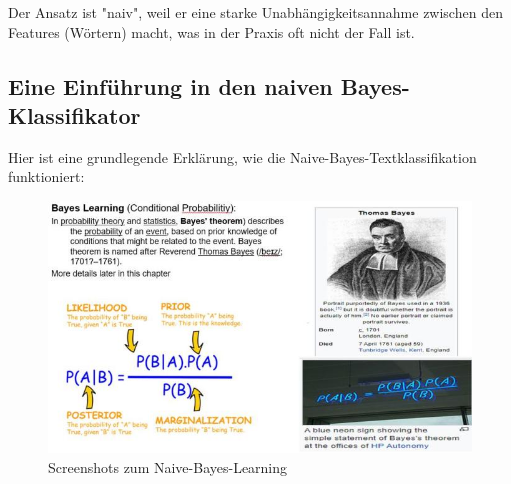 \documentclass[12pt]{article}
\begin{document}
Der Ansatz ist "naiv", weil er eine starke Unabhängigkeitsannahme zwischen den Features (Wörtern) macht, was in der Praxis oft nicht der Fall ist.

\subsection{Eine Einführung in den naiven Bayes-Klassifikator}

Hier ist eine grundlegende Erklärung, wie die Naive-Bayes-Textklassifikation funktioniert:\\

\begin{figure}[htb]
  \centering
  \hspace*{-1.5cm} 
  \includegraphics[width=1.2\textwidth]{Naive-Bayes-Learning}
  \caption{Screenshots zum Naive-Bayes-Learning}
\label{fig:NB_Learning}
\end{figure}
\end{document}
